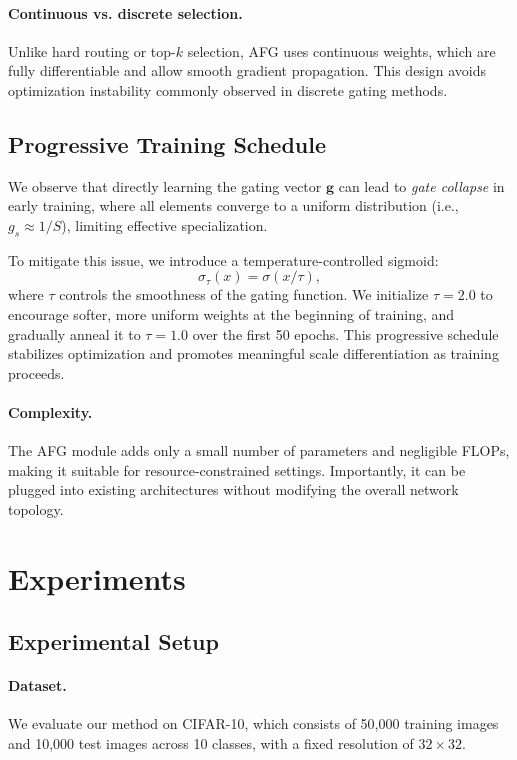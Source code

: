 \documentclass[11pt]{article}
\begin{document}
\paragraph{Continuous vs. discrete selection.}
Unlike hard routing or top-$k$ selection, AFG uses continuous weights, which are
fully differentiable and allow smooth gradient propagation. This design avoids
optimization instability commonly observed in discrete gating methods.

\subsection{Progressive Training Schedule}

We observe that directly learning the gating vector $\mathbf{g}$ can lead to
\emph{gate collapse} in early training, where all elements converge to a uniform
distribution (i.e., $g_s \approx 1/S$), limiting effective specialization.

To mitigate this issue, we introduce a temperature-controlled sigmoid:
\begin{equation}
\sigma_\tau(x) = \sigma(x / \tau),
\end{equation}
where $\tau$ controls the smoothness of the gating function. We initialize
$\tau=2.0$ to encourage softer, more uniform weights at the beginning of
training, and gradually anneal it to $\tau=1.0$ over the first 50 epochs. This
progressive schedule stabilizes optimization and promotes meaningful scale
differentiation as training proceeds.

\paragraph{Complexity.}
The AFG module adds only a small number of parameters and negligible FLOPs,
making it suitable for resource-constrained settings. Importantly, it can be
plugged into existing architectures without modifying the overall network
topology.

\section{Experiments}

\subsection{Experimental Setup}

\paragraph{Dataset.}
We evaluate our method on CIFAR-10, which consists of 50,000 training images and
10,000 test images across 10 classes, with a fixed resolution of $32\times32$.
\end{document}

